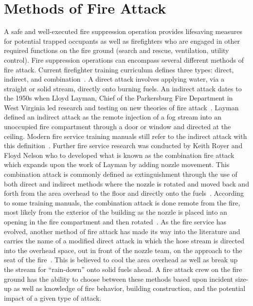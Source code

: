 \documentclass[12pt,oneside]{book}
\begin{document}
\section*{Methods of Fire Attack}

A safe and well-executed fire suppression operation provides lifesaving measures for potential trapped occupants as well as firefighters who are engaged in other required functions on the fire ground (search and rescue, ventilation, utility control). Fire suppression operations can encompass several different methods of fire attack. Current firefighter training curriculum defines three types: direct, indirect, and combination~\cite{Essentials6}. A direct attack involves applying water, via a straight or solid stream, directly onto burning fuels. An indirect attack dates to the 1950s when Lloyd Layman, Chief of the Parkersburg Fire Department in West Virginia led research and testing on new theories of fire attack~\cite{ExtinguishingFires, FirefightingTactics}. Layman defined an indirect attack as the remote injection of a fog stream into an unoccupied fire compartment through a door or window and directed at the ceiling. Modern fire service training manuals still refer to the indirect attack with this definition~\cite{Essentials6,FEHandbook}. Further fire service research was conducted by Keith Royer and Floyd Nelson who to developed what is known as the combination fire attack which expands upon the work of Layman by adding nozzle movement. This combination attack is commonly defined as extinguishment through the use of both direct and indirect methods where the nozzle is rotated and moved back and forth from the area overhead to the floor and directly onto the fuels~\cite{Essentials6}. According to some training manuals, the combination attack is done remote from the fire, most likely from the exterior of the building as the nozzle is placed into an opening in the fire compartment and then rotated~\cite{FEHandbook}. As the fire service has evolved, another method of fire attack has made its way into the literature and carries the name of a modified direct attack in which the hose stream is directed into the overhead space, out in front of the nozzle team, on the approach to the seat of the fire~\cite{FEHandbook}. This is believed to cool the area overhead as well as break up the stream for ``rain-down'' onto solid fuels ahead. A fire attack crew on the fire ground has the ability to choose between these methods based upon incident size-up as well as knowledge of fire behavior, building construction, and the potential impact of a given type of attack.
\end{document}
